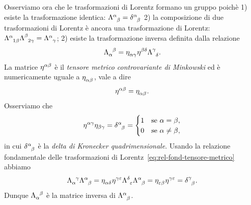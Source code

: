 Osserviamo ora che le trasformazioni di Lorentz formano un gruppo poichè
1) esiste la trasformazione identica:
$\tensor{\Lambda}{^{\alpha}_{\beta}} =   \tensor{\delta}{^{\alpha}_{\beta}}$
2) la composizione di due trasformazioni di Lorentz è ancora una trasformazione di
Lorentz:
$\tensor{\Lambda}{^{\alpha}_{1 \beta}} \tensor{\Lambda}{^{\beta}_{2 \gamma}} =
\tensor{\Lambda}{^{\alpha}_{\gamma}}$;
2) esiste la trasformazione inversa definita dalla relazione
\begin{equation}
  \tensor{\Lambda}{_{\alpha}^{\beta}} = \tensor{\eta}{_{\alpha\gamma}}
  \tensor{\eta}{^{\beta\delta}} \tensor{\Lambda}{^{\gamma}_{\delta}}.
\end{equation}
La matrice $\tensor{\eta}{^{\alpha\beta}}$ è il
\emph{tensore metrico controvariante di
  Minkowski}
ed è numericamente uguale a $\tensor{\eta}{_{\alpha\beta}}$, vale a dire
\begin{equation}
  \tensor{\eta}{^{\alpha\beta}} = \tensor{\eta}{_{\alpha\beta}}.
\end{equation}
Osserviamo che
\begin{equation}
  \label{eq:delta-kronecker}
  \eta^{\alpha\gamma} \eta_{\beta\gamma} =
  \tensor{\delta}{^{\alpha}_{\beta}} =
  \begin{cases}
    1 & \text{se } \alpha = \beta, \\
    0 & \text{se } \alpha \neq \beta,
  \end{cases}
\end{equation}
in cui $\tensor{\delta}{^{\alpha}_{\beta}}$
è la \emph{delta di Kronecker
  quadrimensionale}. Usando la relazione fondamentale delle trasformazioni di
Lorentz~\eqref{eq:rel-fond-tensore-metrico} abbiamo
\begin{equation}
  \tensor{\Lambda}{_{\alpha}^{\gamma}} \tensor{\Lambda}{^{\alpha}_{\beta}} =
  \tensor{\eta}{_{\alpha\delta}} \tensor{\eta}{^{\gamma\epsilon}}
  \tensor{\Lambda}{^{\delta}_{\epsilon}} \tensor{\Lambda}{^{\alpha}_{\beta}} =
  \tensor{\eta}{_{\epsilon\beta}} \tensor{\eta}{^{\gamma\epsilon}} =
  \tensor{\delta}{^{\gamma}_{\beta}}.
\end{equation}
Dunque $\tensor{\Lambda}{_{\alpha}^{\beta}}$ è la matrice inversa di
$\tensor{\Lambda}{^{\alpha}_{\beta}}$.

